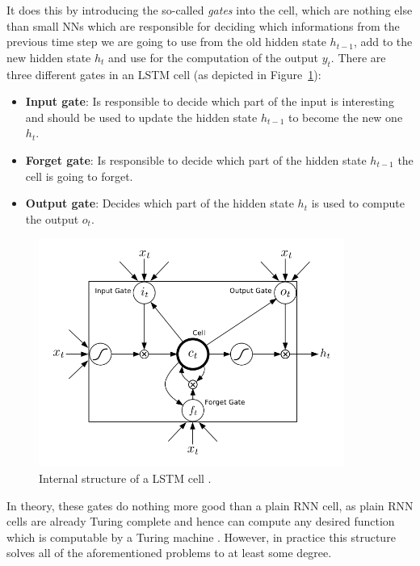 It does this by introducing the so-called \emph{gates} into the cell, which are nothing else than small NNs which are responsible for deciding which informations from the previous time step we are going to use from the old hidden state $h_{t-1}$, add to the new hidden state $h_t$ and use for the computation of the output $y_t$. There are three different gates in an LSTM cell (as depicted in Figure~\ref{fundamentals:lstm:internal_structure}):

\begin{itemize}
	\item \textbf{Input gate}: Is responsible to decide which part of the input is interesting and should be used to update the hidden state $h_{t-1}$ to become the new one $h_t$.
	\item \textbf{Forget gate}: Is responsible to decide which part of the hidden state $h_{t-1}$ the cell is going to forget.
	\item \textbf{Output gate}: Decides which part of the hidden state $h_t$ is used to compute the output $o_t$.
\end{itemize}

\begin{figure}[h]
	\centering
	\includegraphics[width=10cm]{img/lstm_internal}
	\caption{Internal structure of a LSTM cell \cite{Graves:2013}.}
	\label{fundamentals:lstm:internal_structure}
\end{figure}

In theory, these gates do nothing more good than a plain RNN cell, as plain RNN cells are already Turing complete and hence can compute any desired function which is computable by a Turing machine \cite{Siegelmann:1995}. However, in practice this structure solves all of the aforementioned problems to at least some degree.

